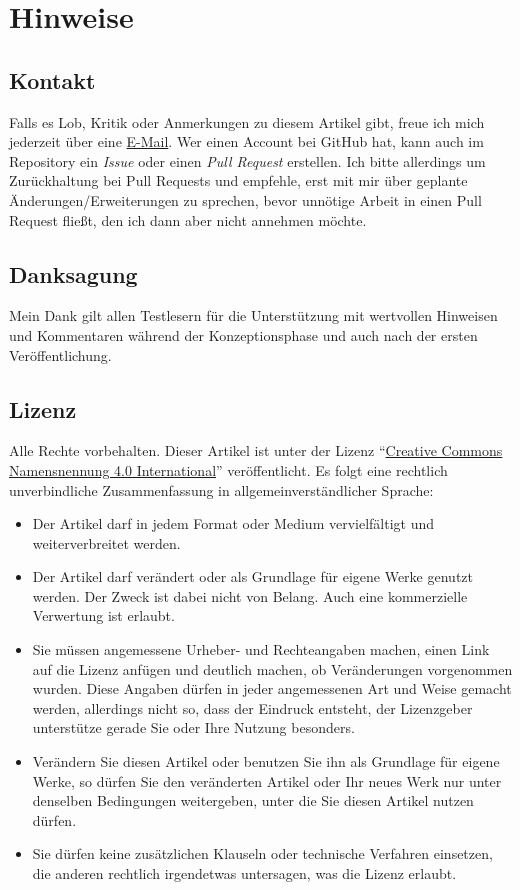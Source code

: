 \clearpage
{}
\printbibliography[title = {Quellen}, heading=bibnumbered]
\clearpage

\chapter{Hinweise}
\section{Kontakt}
Falls es Lob, Kritik oder Anmerkungen zu diesem Artikel gibt, freue ich mich jederzeit über eine \href{https://kreuvf.de/impressum.php}{E-Mail}. Wer einen Account bei GitHub hat, kann auch im Repository ein \emph{Issue} oder einen \emph{Pull Request} erstellen. Ich bitte allerdings um Zurückhaltung bei Pull Requests und empfehle, erst mit mir über geplante Änderungen/Erweiterungen zu sprechen, bevor unnötige Arbeit in einen Pull Request fließt, den ich dann aber nicht annehmen möchte.

\section{Danksagung}
Mein Dank gilt allen Testlesern für die Unterstützung mit wertvollen Hinweisen und Kommentaren während der Konzeptionsphase und auch nach der ersten Veröffentlichung.

\section{Lizenz}
Alle Rechte vorbehalten.
Dieser Artikel ist unter der Lizenz \enquote{\href{https://creativecommons.org/licenses/by/4.0/legalcode.de}{Creative Commons Namensnennung 4.0 International}} veröffentlicht. Es folgt eine rechtlich unverbindliche Zusammenfassung in allgemeinverständlicher Sprache:
\begin{itemize}
	\item Der Artikel darf in jedem Format oder Medium vervielfältigt und weiterverbreitet werden.
	\item Der Artikel darf verändert oder als Grundlage für eigene Werke genutzt werden. Der Zweck ist dabei nicht von Belang. Auch eine kommerzielle Verwertung ist erlaubt.
	\item Sie müssen angemessene Urheber- und Rechteangaben machen, einen Link auf die Lizenz anfügen und deutlich machen, ob Veränderungen vorgenommen wurden. Diese Angaben dürfen in jeder angemessenen Art und Weise gemacht werden, allerdings nicht so, dass der Eindruck entsteht, der Lizenzgeber unterstütze gerade Sie oder Ihre Nutzung besonders.
	\item Verändern Sie diesen Artikel oder benutzen Sie ihn als Grundlage für eigene Werke, so dürfen Sie den veränderten Artikel oder Ihr neues Werk nur unter denselben Bedingungen weitergeben, unter die Sie diesen Artikel nutzen dürfen.
	\item Sie dürfen keine zusätzlichen Klauseln oder technische Verfahren einsetzen, die anderen rechtlich irgendetwas untersagen, was die Lizenz erlaubt.
\end{itemize}

